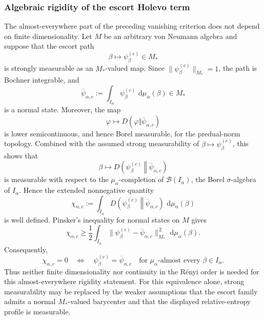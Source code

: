 \documentclass[12pt]{article}
\numberwithin{equation}{section}
\theoremstyle{definition}
\theoremstyle{remark}
\newcommand{\dd}{\,\mathrm d}
\newcommand{\?}{\overset{?}{=}}
\begin{document}
\subsubsection{Algebraic rigidity of the escort Holevo term}
The almost-everywhere part of the preceding vanishing criterion does not
depend on finite dimensionality.  Let \(M\) be an arbitrary von Neumann
algebra and suppose that the escort path
\[
  \beta\longmapsto\psi_\beta^{(c)}\in M_*
\]
is strongly measurable as an \(M_*\)-valued map.  Since
\(\|\psi_\beta^{(c)}\|_{M_*}=1\), the path is Bochner integrable, and
\begin{equation}
  \overline\psi_{\alpha,c}
  :=
  \int_{I_\alpha}
    \psi_\beta^{(c)}\,\dd\mu_\alpha(\beta)
  \in M_*
  \label{eq:algebraic-escort-barycenter}
\end{equation}
is a normal state.  Moreover, the map
\[
  \varphi\longmapsto
  D(\varphi\Vert\overline\psi_{\alpha,c})
\]
is lower semicontinuous, and hence Borel measurable, for the
predual-norm topology.  Combined with the assumed strong
measurability of
\(\beta\mapsto\psi_\beta^{(c)}\), this shows that
\[
  \beta\longmapsto
  D\!\left(
    \psi_\beta^{(c)}
    \middle\Vert
    \overline\psi_{\alpha,c}
  \right)
\]
is measurable with respect to the \(\mu_\alpha\)-completion of
\(\mathcal B(I_\alpha)\), the Borel $\sigma$-algebra of $I_\alpha$.  Hence the extended nonnegative quantity
\begin{equation}
  \chi_{\alpha,c}
  :=
  \int_{I_\alpha}
    D\!\left(
      \psi_\beta^{(c)}
      \middle\Vert
      \overline\psi_{\alpha,c}
    \right)
    \,\dd\mu_\alpha(\beta)
  \label{eq:algebraic-escort-holevo}
\end{equation}
is well defined.  Pinsker's inequality for normal states on \(M\) \cite{Hiai1981SufficiencyKC} gives
\begin{equation}
  \chi_{\alpha,c}
  \geq
  \frac12
  \int_{I_\alpha}
    \bigl\|
      \psi_\beta^{(c)}-\overline\psi_{\alpha,c}
    \bigr\|_{M_*}^{\,2}
    \,\dd\mu_\alpha(\beta).
  \label{eq:algebraic-escort-holevo-pinsker}
\end{equation}
Consequently,
\begin{equation}
    \chi_{\alpha,c}=0
    \quad\Longleftrightarrow\quad
    \psi_\beta^{(c)}
    =
    \overline\psi_{\alpha,c}
    \quad\text{for \(\mu_\alpha\)-almost every
    \(\beta\in I_\alpha\)}.
  \label{eq:algebraic-escort-holevo-rigidity}
\end{equation}
Thus neither finite dimensionality nor continuity in the R\'enyi order is
needed for this almost-everywhere rigidity statement.  For this
equivalence alone, strong measurability may be replaced by the weaker
assumptions that the escort family admits a normal \(M_*\)-valued barycenter
and that the displayed relative-entropy profile is measurable.
\end{document}
